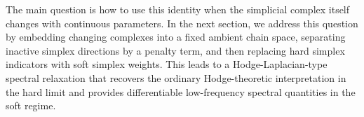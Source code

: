 \documentclass[pdflatex,sn-mathphys-ay]{sn-jnl}%
\theoremstyle{thmstyleone}%
\theoremstyle{thmstyletwo}%
\theoremstyle{thmstylethree}%
\begin{document}
The main question is how to use this identity when the simplicial complex itself changes with continuous parameters. In the next section, we address this question by embedding changing complexes into a fixed ambient chain space, separating inactive simplex directions by a penalty term, and then replacing hard simplex indicators with soft simplex weights. This leads to a Hodge-Laplacian-type spectral relaxation that recovers the ordinary Hodge-theoretic interpretation in the hard limit and provides differentiable low-frequency spectral quantities in the soft regime.








\end{document}
